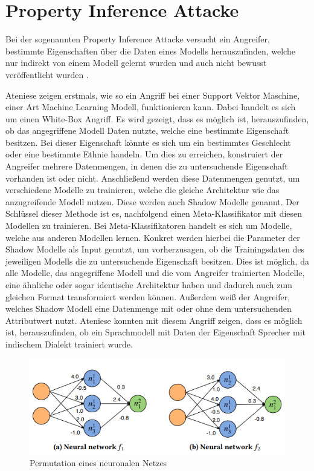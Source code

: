 \section{Property Inference Attacke}\label{sec:property_inference}

Bei der sogenannten Property Inference Attacke versucht ein Angreifer, bestimmte Eigenschaften über die Daten eines Modells herauszufinden, welche nur indirekt von einem Modell gelernt wurden und auch nicht bewusst veröffentlicht wurden \cite{P-80}.

Ateniese \etal \cite{P-80} zeigen erstmals, wie so ein Angriff bei einer Support Vektor Maschine, einer Art Machine Learning Modell, funktionieren kann.
Dabei handelt es sich um einen White-Box Angriff.
Es wird gezeigt, dass es möglich ist, herauszufinden, ob das angegriffene Modell Daten nutzte, welche eine bestimmte Eigenschaft besitzen.
Bei dieser Eigenschaft könnte es sich \zB um ein bestimmtes Geschlecht oder eine bestimmte Ethnie handeln.
Um dies zu erreichen, konstruiert der Angreifer mehrere Datenmengen, in denen die zu untersuchende Eigenschaft vorhanden ist oder nicht. 
Anschließend werden diese Datenmengen genutzt, um verschiedene Modelle zu trainieren, welche die gleiche Architektur wie das anzugreifende Modell nutzen.
Diese werden auch Shadow Modelle genannt.
Der Schlüssel dieser Methode ist es, nachfolgend einen Meta-Klassifikator mit diesen Modellen zu trainieren.
Bei Meta-Klassifikatoren handelt es sich um Modelle, welche aus anderen Modellen lernen. 
Konkret werden hierbei die Parameter der Shadow Modelle als Input genutzt, um vorherzusagen, ob die Trainingsdaten des jeweiligen Modells die zu untersuchende Eigenschaft besitzen. 
Dies ist möglich, da alle Modelle, das angegriffene Modell und die vom Angreifer trainierten Modelle, eine ähnliche oder sogar identische Architektur haben und dadurch auch zum gleichen Format transformiert werden können.
Außerdem weiß der Angreifer, welches Shadow Modell eine Datenmenge mit oder ohne dem untersuchenden Attributwert nutzt.
Ateniese \etal \cite{P-80} konnten mit diesem Angriff zeigen, dass es möglich ist, herauszufinden, ob ein Sprachmodell mit Daten der Eigenschaft \dq Sprecher mit indischem Dialekt \dq trainiert wurde. 

\begin{figure}[!htb]
    \centering
    \includegraphics[width=12cm]{figures/permutation_invariance}
    \caption{Permutation eines neuronalen Netzes \cite{P-11}}
    \label{fig:permutation_invariance}
\end{figure} 

